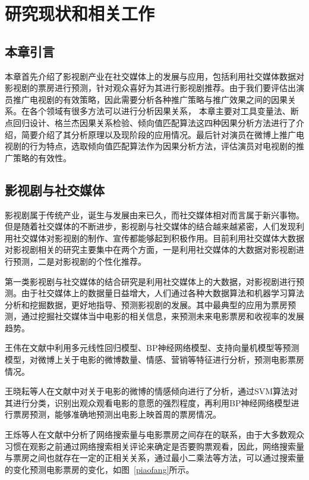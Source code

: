 \chapter{研究现状和相关工作}

\section{本章引言}

本章首先介绍了影视剧产业在社交媒体上的发展与应用，包括利用社交媒体数据对影视剧的票房进行预测，针对观众喜好为其进行影视剧推荐。由于我们要评估出演员推广电视剧的有效策略，因此需要分析各种推广策略与推广效果之间的因果关系。在各个领域有很多方法可以进行分析因果关系，
本章主要对工具变量法、断点回归设计、格兰杰因果关系检验、倾向值匹配算法这四种因果分析方法进行了介绍，简要介绍了其分析原理以及现阶段的应用情况。最后针对演员在微博上推广电视剧的行为特点，选取倾向值匹配算法作为因果分析方法，评估演员对电视剧的推广策略的有效性。

\section{影视剧与社交媒体}

影视剧属于传统产业，诞生与发展由来已久，而社交媒体相对而言属于新兴事物。但是随着社交媒体的不断进步，影视剧与社交媒体的结合越来越紧密，人们发现利用社交媒体对影视剧的制作、宣传都能够起到积极作用。目前利用社交媒体大数据对影视剧相关的研究主要集中在两个方面，一是利用社交媒体的大数据对影视剧进行预测，二是对影视剧的个性化推荐。

第一类影视剧与社交媒体的结合研究是利用社交媒体上的大数据，对影视剧进行预测。由于社交媒体上的数据量日益增大，人们通过各种大数据算法和机器学习算法分析和挖掘数据，更好地指导、预测影视剧的发展。其中最典型的应用为票房预测，通过挖掘社交媒体当中电影的相关信息，来预测未来电影票房和收视率的发展趋势。

王伟在文献\cite{王伟2015基于微博数据的电影票房预测研究}中利用多元线性回归模型、BP神经网络模型、支持向量机模型等预测模型，对微博上关于电影的微博数量、情感、营销等特征进行分析，预测电影票房情况。

王晓耘等人在文献\cite{王晓耘2016基于微博的电影首映周票房预测建模}中对关于电影的微博的情感倾向进行了分析，通过SVM算法对其进行分类，识别出观众观看电影的意愿的强烈程度，再利用BP神经网络模型进行票房预测，能够准确地预测出电影上映首周的票房情况。

王烁等人在文献\cite{王炼2014基于网络搜索的票房预测模型}中分析了网络搜索量与电影票房之间存在的联系，由于大多数观众习惯在观影之前通过网络搜索相关评论来确定是否要购票观看，因此，网络搜索量与票房之间也就存在一定的正相关关系，通过最小二乘法等方法，可以通过搜索量的变化预测电影票房的变化，如图~\ref{piaofang}所示。

